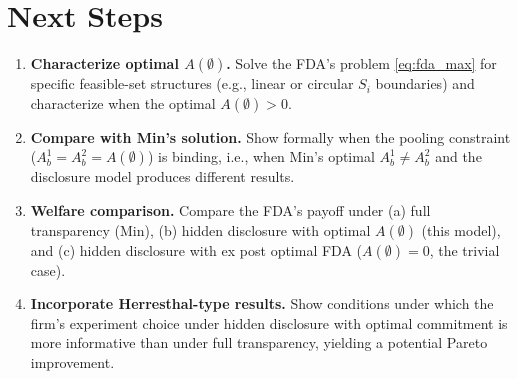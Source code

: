\documentclass[12pt,a4paper]{article}
\begin{document}
\section{Next Steps}
\label{sec:next_steps}

\begin{enumerate}
  \item \textbf{Characterize optimal $A(\emptyset)$.}
    Solve the FDA's problem \eqref{eq:fda_max} for specific
    feasible-set structures (e.g., linear or circular $S_i$
    boundaries) and characterize when the optimal
    $A(\emptyset) > 0$.

  \item \textbf{Compare with Min's solution.}
    Show formally when the pooling constraint
    ($A_b^1 = A_b^2 = A(\emptyset)$) is binding, i.e., when
    Min's optimal $A_b^1 \neq A_b^2$ and the disclosure model
    produces different results.

  \item \textbf{Welfare comparison.}
    Compare the FDA's payoff under (a) full transparency
    (Min), (b) hidden disclosure with optimal $A(\emptyset)$
    (this model), and (c) hidden disclosure with ex post
    optimal FDA ($A(\emptyset) = 0$, the trivial case).

  \item \textbf{Incorporate Herresthal-type results.}
    Show conditions under which the firm's experiment choice
    under hidden disclosure with optimal commitment is more
    informative than under full transparency, yielding a
    potential Pareto improvement.
\end{enumerate}
\end{document}
